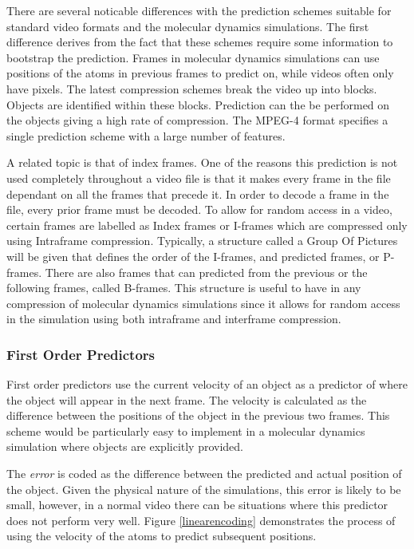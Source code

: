 \documentclass[a4paper,11pt]{report}
\begin{document}
There are several noticable differences with the prediction schemes suitable for standard video formats and the molecular dynamics simulations. The first difference derives from the fact that these schemes require some information to bootstrap the prediction. Frames in molecular dynamics simulations can use positions of the atoms in previous frames to predict on, while videos often only have pixels. The latest compression schemes break the video up into blocks. Objects are identified within these blocks. Prediction can the be performed on the objects giving a high rate of compression. The MPEG-4 format specifies a single prediction scheme with a large number of features\cite{wiegand2003oha}. 

A related topic is that of index frames. One of the reasons this prediction is not used completely throughout a video file is that it makes every frame in the file dependant on all the frames that precede it. In order to decode a frame in the file, every prior frame must be decoded. To allow for random access in a video, certain frames are labelled as Index frames or I-frames which are compressed only using Intraframe compression. Typically, a structure called a Group Of Pictures will be given that defines the order of the I-frames, and predicted frames, or P-frames\cite{vandalore2001sal}. There are also frames that can predicted from the previous or the following frames, called B-frames. This structure is useful to have in any compression of molecular dynamics simulations since it allows for random access in the simulation using both intraframe and interframe compression.

\subsubsection{First Order Predictors}

First order predictors use the current velocity of an object as a predictor of where the object will appear in the next frame. The velocity is calculated as the difference between the positions of the object in the previous two frames. This scheme would be particularly easy to implement in a molecular dynamics simulation where objects are explicitly provided.

The \emph{error} is coded as the difference between the predicted and actual position of the object. Given the physical nature of the simulations, this error is likely to be small, however, in a normal video there can be situations where this predictor does not perform very well. Figure \ref{linearencoding} demonstrates the process of using the velocity of the atoms to predict subsequent positions.
\end{document}
